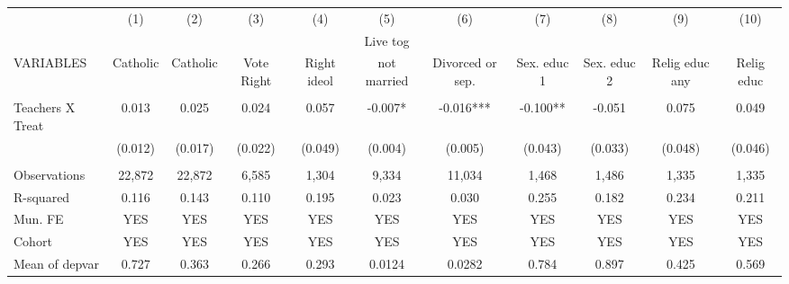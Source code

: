 \begin{tabular}{lcccccccccc} \hline
 & (1) & (2) & (3) & (4) & (5) & (6) & (7) & (8) & (9) & (10) \\
 &  &  &  &  & Live tog &  &  &  &  &  \\
VARIABLES & Catholic & Catholic & Vote Right & Right ideol & not married & Divorced or sep. & Sex. educ 1 & Sex. educ 2 & Relig educ any & Relig educ \\ \hline
 &  &  &  &  &  &  &  &  &  &  \\
Teachers X Treat & 0.013 & 0.025 & 0.024 & 0.057 & -0.007* & -0.016*** & -0.100** & -0.051 & 0.075 & 0.049 \\
 & (0.012) & (0.017) & (0.022) & (0.049) & (0.004) & (0.005) & (0.043) & (0.033) & (0.048) & (0.046) \\
 &  &  &  &  &  &  &  &  &  &  \\
Observations & 22,872 & 22,872 & 6,585 & 1,304 & 9,334 & 11,034 & 1,468 & 1,486 & 1,335 & 1,335 \\
R-squared & 0.116 & 0.143 & 0.110 & 0.195 & 0.023 & 0.030 & 0.255 & 0.182 & 0.234 & 0.211 \\
Mun. FE & YES & YES & YES & YES & YES & YES & YES & YES & YES & YES \\
Cohort & YES & YES & YES & YES & YES & YES & YES & YES & YES & YES \\
 Mean of depvar & 0.727 & 0.363 & 0.266 & 0.293 & 0.0124 & 0.0282 & 0.784 & 0.897 & 0.425 & 0.569 \\ \hline
\end{tabular}
